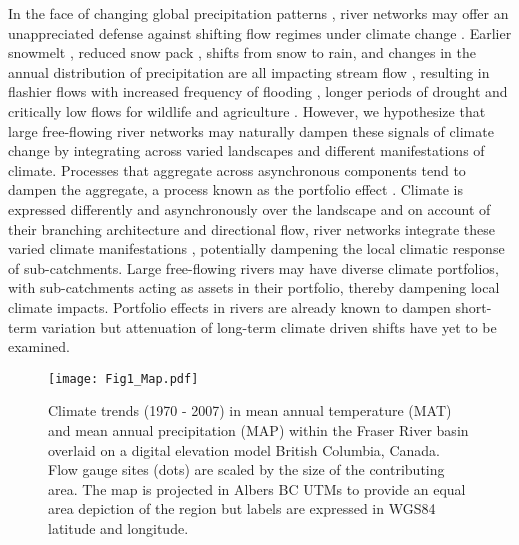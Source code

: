 \documentclass{AGUJournal}
\begin{document}
	In the face of changing global precipitation patterns \citep{Donat:2016}, river networks may offer an unappreciated defense against shifting flow regimes under climate change \citep{Hartmann:2013,Palmer:2009}. Earlier snowmelt \citep{Rauscher:2008}, reduced snow pack \citep{McCabe:2014}, shifts from snow to rain, and changes in the annual distribution of precipitation are all impacting stream flow \citep{Hartmann:2013}, resulting in flashier flows with increased frequency of flooding \citep{Hirabayashi:2013}, longer periods of drought and critically low flows for wildlife and agriculture \citep{Melillo:2014}. However, we hypothesize that large free-flowing river networks may naturally dampen these signals of climate change by integrating across varied landscapes and different manifestations of climate. Processes that aggregate across asynchronous components tend to dampen the aggregate, a process known as the portfolio effect \citep{Doak:1998}. Climate is expressed differently and asynchronously over the landscape \citep [e.g.,][]{Wang:2012} and on account of their branching architecture and directional flow, river networks integrate these varied climate manifestations \citep{Peterson:2013}, potentially dampening the local climatic response of sub-catchments. Large free-flowing rivers may have diverse climate portfolios, with sub-catchments acting as assets in their portfolio, thereby dampening local climate impacts. Portfolio effects in rivers are already known to dampen short-term variation \citep{Moore:2015,Yeakel:2014} but attenuation of long-term climate driven shifts have yet to be examined.

\begin{figure}[h]
\centering
\texttt{[image: Fig1\_Map.pdf]}
	\caption{Climate trends (1970 - 2007) in mean annual temperature (MAT) and mean annual precipitation (MAP) within the Fraser River basin overlaid on a digital elevation model  British Columbia, Canada. Flow gauge sites (dots) are scaled by the size of the contributing area. The map is projected in Albers BC UTMs to provide an equal area depiction of the region but labels are expressed in WGS84 latitude and longitude.}
\label{fig:1}
\end{figure}
\end{document}
